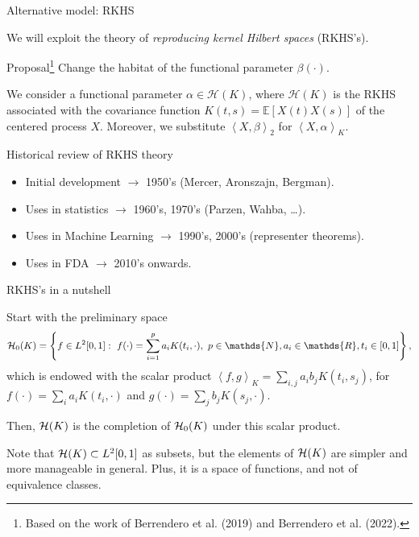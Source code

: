 \documentclass[9pt, english, professionalfonts]{beamer}
\newcommand\maroon[1]{\color{mLightBrown}#1\color{mDarkTeal}}
\newcommand{\N} {\ensuremath{\mathds{N}}}
\newcommand{\R} {\ensuremath{\mathds{R}}}
\newcommand{\Hcal} {\ensuremath\mathcal{H}}
\newcommand\dotprod[2]{\left\langle #1, #2 \right\rangle}
\begin{document}
\begin{frame}{Alternative model: RKHS}

We will exploit the theory of \textit{reproducing kernel Hilbert spaces} (RKHS's).

\vspace{1em}
\begin{alertblock}{Proposal\footnote[2]{Based on the work of Berrendero et al. (2019) and Berrendero et al. (2022).}}
  Change the habitat of the functional parameter \(\beta(\cdot)\).
\end{alertblock}

\vspace{1em}
  We consider a functional parameter \maroon{\(\alpha \in \mathcal H(K)\)}, where \(\mathcal H(K)\) is the RKHS associated with the covariance function \(K(t, s)=\mathbb E[X(t)X(s)]\) of the centered process \(X\). Moreover, we substitute \(\dotprod{X}{\beta}_2\) for \maroon{\(\dotprod{X}{\alpha}_K\)}.
\end{frame}

\begin{frame}{Historical review of RKHS theory}
  \begin{itemize}
    \item Initial development \(\longrightarrow\) 1950's (Mercer, Aronszajn, Bergman).
    \item Uses in statistics \(\longrightarrow\) 1960's, 1970's (Parzen, Wahba, \ldots).
    \item Uses in Machine Learning \(\longrightarrow\) 1990's, 2000's (representer theorems).
    \item Uses in FDA \(\longrightarrow\) 2010's onwards.
  \end{itemize}
\end{frame}


\begin{frame}{RKHS's in a nutshell}
  \begin{definition}
    Start with the preliminary space
    \[
    \Hcal_0(K) = \left\{ f \in L^2[0,1]: \ f(\cdot) = \sum_{i=1}^p a_i K(t_i, \cdot), \ p \in \N,  a_i \in \R,  t_i \in [0, 1] \right\},
    \]
    which is endowed with the scalar product \(\dotprod{f}{g}_K = \sum_{i, j} a_i b_j K(t_i, s_j)\), for \(f(\cdot)=\sum_i a_i K(t_i, \cdot) \) and \(g(\cdot)=\sum_j b_j K(s_j, \cdot)\).

    Then, \(\Hcal(K)\) is the completion of \(\Hcal_0(K)\) under this scalar product.
  \end{definition}

  \vspace{1em}

  Note that \(\Hcal(K)\subset L^2[0, 1]\) as subsets, but the elements of \(\Hcal(K)\) are simpler and more manageable in general. Plus, it is a space of \maroon{functions}, and not of equivalence classes.
\end{frame}
\end{document}
